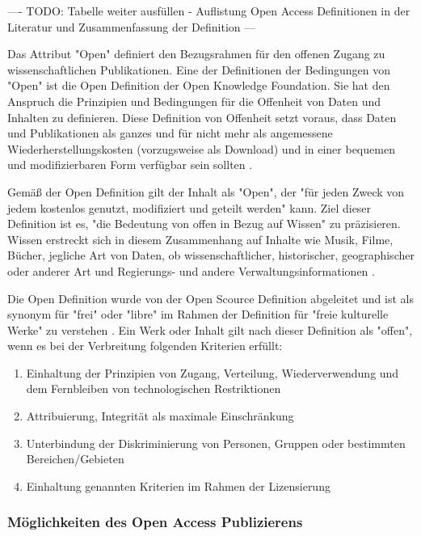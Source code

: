 ---- TODO: Tabelle weiter ausfüllen - Auflistung Open Access Definitionen in der Literatur und Zusammenfassung der Definition ---

Das Attribut "Open" definiert den Bezugsrahmen für den offenen Zugang zu wissenschaftlichen Publikationen. Eine der Definitionen der Bedingungen von "Open" ist die Open Definition der Open Knowledge Foundation. Sie hat den Anspruch die Prinzipien und Bedingungen für die Offenheit von Daten und Inhalten zu definieren. Diese Definition von Offenheit setzt voraus, dass Daten und Publikationen als ganzes und für nicht mehr als angemessene Wiederherstellungskosten (vorzugsweise als Download) und in einer bequemen und modifizierbaren Form verfügbar sein sollten \cite{Molloy_2011}.

Gemäß der Open Definition gilt der Inhalt als "Open", der "für jeden Zweck von jedem kostenlos genutzt, modifiziert und geteilt werden" \cite{open_definition} kann. Ziel dieser Definition ist es, "die Bedeutung von offen in Bezug auf Wissen" zu präzisieren. Wissen erstreckt sich in diesem Zusammenhang auf Inhalte wie Musik, Filme, Bücher, jegliche Art von Daten, ob wissenschaftlicher, historischer, geographischer oder anderer Art und Regierungs- und andere Verwaltungsinformationen \cite{open_definition}.

Die Open Definition wurde von der Open Scource Definition abgeleitet und ist als synonym für "frei" oder "libre" im Rahmen der Definition für "freie kulturelle Werke" zu verstehen \cite{suchen}. Ein Werk oder Inhalt gilt nach dieser Definition als "offen", wenn es bei der Verbreitung folgenden Kriterien erfüllt:
\begin{enumerate}
\item Einhaltung der Prinzipien von Zugang, Verteilung, Wiederverwendung und dem Fernbleiben von technologischen Restriktionen
\item Attribuierung, Integrität als maximale Einschränkung
\item Unterbindung der Diskriminierung von Personen, Gruppen oder bestimmten Bereichen/Gebieten
\item Einhaltung genannten Kriterien  im Rahmen der Lizensierung
\end{enumerate}

\subsubsection{Möglichkeiten des Open Access Publizierens}


